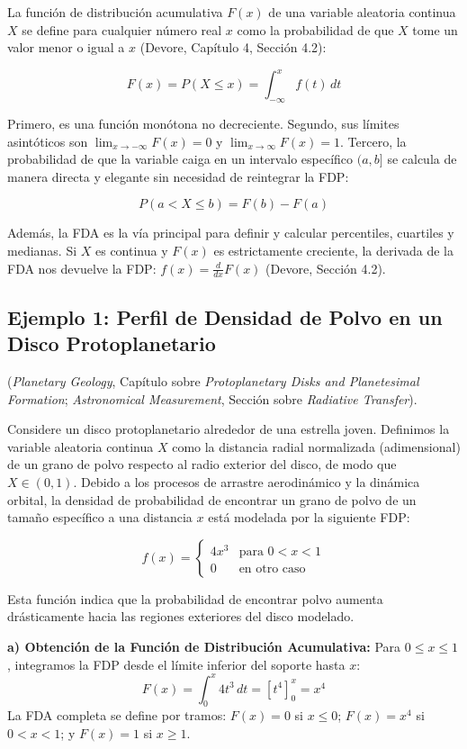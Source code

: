 La función de distribución acumulativa $F(x)$ de una variable aleatoria continua $X$ se define para cualquier número real $x$ como la probabilidad de que $X$ tome un valor menor o igual a $x$ (Devore, Capítulo 4, Sección 4.2):

$$ F(x) = P(X \le x) = \int_{-\infty}^{x} f(t) \, dt $$

Primero, es una función monótona no decreciente. Segundo, sus límites asintóticos son $\lim_{x \to -\infty} F(x) = 0$ y $\lim_{x \to \infty} F(x) = 1$. Tercero, la probabilidad de que la variable caiga en un intervalo específico $(a, b]$ se calcula de manera directa y elegante sin necesidad de reintegrar la FDP:

$$ P(a < X \le b) = F(b) - F(a) $$

Además, la FDA es la vía principal para definir y calcular percentiles, cuartiles y medianas. Si $X$ es continua y $F(x)$ es estrictamente creciente, la derivada de la FDA nos devuelve la FDP: $f(x) = \frac{d}{dx}F(x)$ (Devore, Sección 4.2).

\subsection{Ejemplo 1: Perfil de Densidad de Polvo en un Disco Protoplanetario}

(\textit{Planetary Geology}, Capítulo sobre \textit{Protoplanetary Disks and Planetesimal Formation}; \textit{Astronomical Measurement}, Sección sobre \textit{Radiative Transfer}).

Considere un disco protoplanetario alrededor de una estrella joven. Definimos la variable aleatoria continua $X$ como la distancia radial normalizada (adimensional) de un grano de polvo respecto al radio exterior del disco, de modo que $X \in (0, 1)$. Debido a los procesos de arrastre aerodinámico y la dinámica orbital, la densidad de probabilidad de encontrar un grano de polvo de un tamaño específico a una distancia $x$ está modelada por la siguiente FDP:

$$
f(x) = 
\begin{cases} 
4x^3 & \text{para } 0 < x < 1 \\
0 & \text{en otro caso}
\end{cases}
$$

Esta función indica que la probabilidad de encontrar polvo aumenta drásticamente hacia las regiones exteriores del disco modelado. 

\textbf{a) Obtención de la Función de Distribución Acumulativa:}
Para $0 \le x \le 1$, integramos la FDP desde el límite inferior del soporte hasta $x$:
$$ F(x) = \int_{0}^{x} 4t^3 \, dt = \left[ t^4 \right]_{0}^{x} = x^4 $$
La FDA completa se define por tramos: $F(x) = 0$ si $x \le 0$; $F(x) = x^4$ si $0 < x < 1$; y $F(x) = 1$ si $x \ge 1$.

